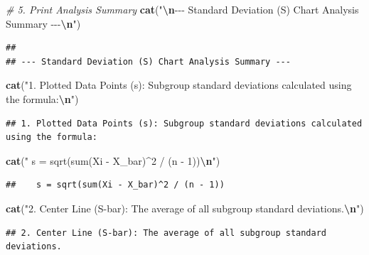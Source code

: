 \documentclass[
]{article}
\newenvironment{Shaded}{\begin{snugshade}}{\end{snugshade}}
\newcommand{\CommentTok}[1]{\textcolor[rgb]{0.56,0.35,0.01}{\textit{#1}}}
\newcommand{\FunctionTok}[1]{\textcolor[rgb]{0.13,0.29,0.53}{\textbf{#1}}}
\newcommand{\NormalTok}[1]{#1}
\newcommand{\SpecialCharTok}[1]{\textcolor[rgb]{0.81,0.36,0.00}{\textbf{#1}}}
\newcommand{\StringTok}[1]{\textcolor[rgb]{0.31,0.60,0.02}{#1}}
\begin{document}
\begin{Shaded}
\begin{Highlighting}[]
\CommentTok{\# 5. Print Analysis Summary}
\FunctionTok{cat}\NormalTok{(}\StringTok{"}\SpecialCharTok{\textbackslash{}n}\StringTok{{-}{-}{-} Standard Deviation (S) Chart Analysis Summary {-}{-}{-}}\SpecialCharTok{\textbackslash{}n}\StringTok{"}\NormalTok{)}
\end{Highlighting}
\end{Shaded}

\begin{verbatim}
## 
## --- Standard Deviation (S) Chart Analysis Summary ---
\end{verbatim}

\begin{Shaded}
\begin{Highlighting}[]
\FunctionTok{cat}\NormalTok{(}\StringTok{"1. Plotted Data Points (s): Subgroup standard deviations calculated using the formula:}\SpecialCharTok{\textbackslash{}n}\StringTok{"}\NormalTok{)}
\end{Highlighting}
\end{Shaded}

\begin{verbatim}
## 1. Plotted Data Points (s): Subgroup standard deviations calculated using the formula:
\end{verbatim}

\begin{Shaded}
\begin{Highlighting}[]
\FunctionTok{cat}\NormalTok{(}\StringTok{"   s = sqrt(sum(Xi {-} X\_bar)\^{}2 / (n {-} 1))}\SpecialCharTok{\textbackslash{}n}\StringTok{"}\NormalTok{)}
\end{Highlighting}
\end{Shaded}

\begin{verbatim}
##    s = sqrt(sum(Xi - X_bar)^2 / (n - 1))
\end{verbatim}

\begin{Shaded}
\begin{Highlighting}[]
\FunctionTok{cat}\NormalTok{(}\StringTok{"2. Center Line (S{-}bar): The average of all subgroup standard deviations.}\SpecialCharTok{\textbackslash{}n}\StringTok{"}\NormalTok{)}
\end{Highlighting}
\end{Shaded}

\begin{verbatim}
## 2. Center Line (S-bar): The average of all subgroup standard deviations.
\end{verbatim}
\end{document}
